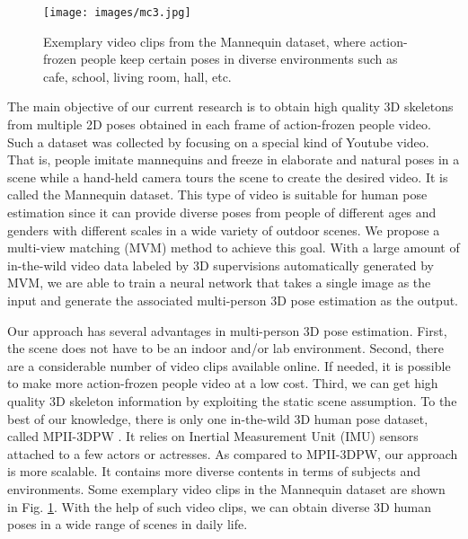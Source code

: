 \documentclass{article}
\begin{document}
\begin{figure}[h]
\centering
\texttt{[image: images/mc3.jpg]}
\caption{Exemplary video clips from the Mannequin dataset, where
action-frozen people keep certain poses in diverse environments such 
as cafe, school, living room, hall, etc.} \label{fig:diversity}
\end{figure}


The main objective of our current research is to obtain high quality 3D
skeletons from multiple 2D poses obtained in each frame of action-frozen
people video.  Such a dataset was collected by focusing on a special
kind of Youtube video. That is, people imitate mannequins and freeze in
elaborate and natural poses in a scene while a hand-held camera tours
the scene to create the desired video. It is called the Mannequin
dataset. This type of video is suitable for human pose estimation since
it can provide diverse poses from people of different ages and genders
with different scales in a wide variety of outdoor scenes.  We propose a
multi-view matching (MVM) method to achieve this goal.  With a large
amount of in-the-wild video data labeled by 3D supervisions
automatically generated by MVM, we are able to train a neural network
that takes a single image as the input and generate the associated
multi-person 3D pose estimation as the output. 

Our approach has several advantages in multi-person 3D pose
estimation.  First, the scene does not have to be an indoor and/or lab
environment. Second, there are a considerable number of video clips
available online. If needed, it is possible to make more action-frozen
people video at a low cost. Third, we can get high quality 3D skeleton
information by exploiting the static scene assumption. To the best of
our knowledge, there is only one in-the-wild 3D human pose dataset,
called MPII-3DPW \cite{von2018recovering}. It relies on Inertial Measurement Unit
(IMU) sensors
attached to a few actors or actresses. As compared to MPII-3DPW, our
approach is more scalable. It contains more diverse contents in terms of
subjects and environments. Some exemplary video clips in the Mannequin
dataset are shown in Fig. \ref{fig:diversity}. With the help of such
video clips, we can obtain diverse 3D human poses in a wide range of
scenes in daily life. 
\end{document}
